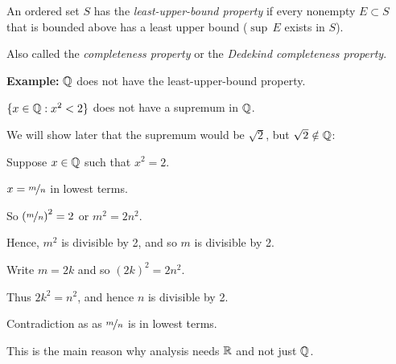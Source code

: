 \documentclass[10pt,aspectratio=149]{beamer}
\begin{document}
\begin{frame}

\begin{definition}
An ordered set $S$ has the \emph{least-upper-bound property} if
every nonempty
$E \subset S$ that is bounded above has a least upper bound
($\sup\, E$ exists in $S$).
\end{definition}

\pause

Also called the \emph{completeness property} or the
\emph{Dedekind completeness property}.

\medskip
\pause

\textbf{Example:}
${\mathbb{Q}}$ does not have the least-upper-bound property.

\pause
\medskip

$\{ x \in {\mathbb{Q}} : x^2 < 2 \}$ does not have a supremum in ${\mathbb{Q}}$.

\medskip
\pause

We will show later that the supremum would be $\sqrt{2}$, but $\sqrt{2}
\notin {\mathbb{Q}}$:

\medskip
\pause

Suppose $x \in {\mathbb{Q}}$ such that $x^2 = 2$.
\pause

$x=\nicefrac{m}{n}$ in lowest terms.

\pause

So ${(\nicefrac{m}{n})}^2 = 2$ or $m^2 = 2n^2$.

\pause

Hence, $m^2$ is divisible by 2, and so $m$ is divisible by 2.

\pause

Write $m = 2k$ and so ${(2k)}^2 = 2n^2$.

\pause
Thus $2k^2 = n^2$, and hence $n$ is divisible by 2.

\pause

Contradiction as  as $\nicefrac{m}{n}$ is in lowest terms.

\medskip
\pause

This is the main reason why analysis needs ${\mathbb{R}}$ and not just ${\mathbb{Q}}$.

\end{frame}
\end{document}
